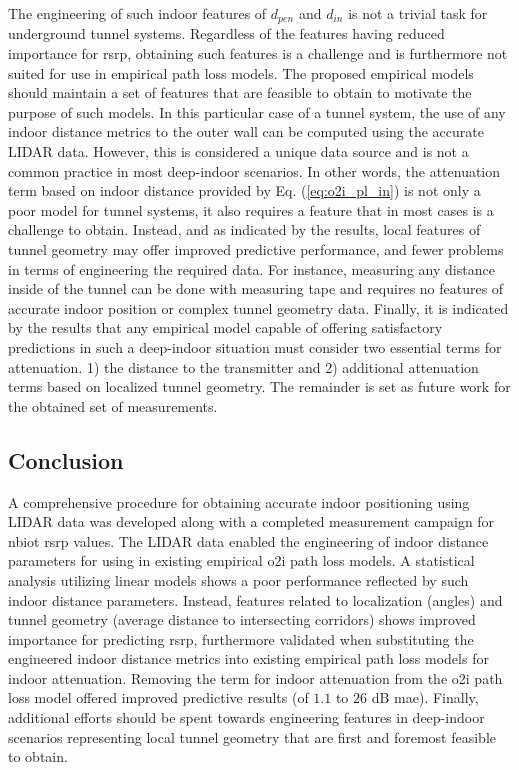 The engineering of such indoor features of $d_{pen}$ and $d_{in}$ is not a trivial task for underground tunnel systems. Regardless of the features having reduced importance for \gls{rsrp}, obtaining such features is a challenge and is furthermore not suited for use in empirical path loss models. The proposed empirical models should maintain a set of features that are feasible to obtain to motivate the purpose of such models. In this particular case of a tunnel system, the use of any indoor distance metrics to the outer wall can be computed using the accurate LIDAR data. However, this is considered a unique data source and is not a common practice in most deep-indoor scenarios. In other words, the attenuation term based on indoor distance provided by Eq. (\ref{eq:o2i_pl_in}) is not only a poor model for tunnel systems, it also requires a feature that in most cases is a challenge to obtain. Instead, and as indicated by the results, local features of tunnel geometry may offer improved predictive performance, and fewer problems in terms of engineering the required data. For instance, measuring any distance inside of the tunnel can be done with measuring tape and requires no features of accurate indoor position or complex tunnel geometry data. Finally, it is indicated by the results that any empirical model capable of offering satisfactory predictions in such a deep-indoor situation must consider two essential terms for attenuation. 1) the distance to the transmitter and 2) additional attenuation terms based on localized tunnel geometry. The remainder is set as future work for the obtained set of measurements.

\subsection{Conclusion }

A comprehensive procedure for obtaining accurate indoor positioning using LIDAR data was developed along with a completed measurement campaign for \gls{nbiot} \gls{rsrp} values. The LIDAR data enabled the engineering of indoor distance parameters for using in existing empirical \gls{o2i} path loss models. A statistical analysis utilizing linear models shows a poor performance reflected by such indoor distance parameters. Instead, features related to localization (angles) and tunnel geometry (average distance to intersecting corridors) shows improved importance for predicting \gls{rsrp}, furthermore validated when substituting the engineered indoor distance metrics into existing empirical path loss models for indoor attenuation. Removing the term for indoor attenuation from the \gls{o2i} path loss model offered improved predictive results (of $1.1$ to $26$ dB \gls{mae}). Finally, additional efforts should be spent towards engineering features in deep-indoor scenarios representing local tunnel geometry that are first and foremost feasible to obtain. 

